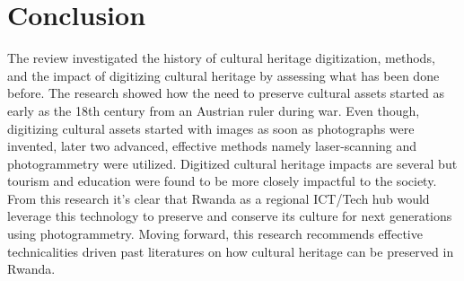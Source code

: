 \documentclass[conference]{IEEEtran}
\begin{document}
\section{\textbf{Conclusion}}
The review investigated the history of cultural heritage digitization, methods, and the impact of digitizing cultural heritage by assessing what has been done before.
The research showed how the need to preserve cultural assets started as early as the 18th century from an Austrian ruler during war. Even though, digitizing cultural assets started with images as soon as photographs were invented, later two
advanced, effective methods namely laser-scanning and photogrammetry were utilized. Digitized cultural heritage impacts are several but tourism and education were found to be more closely impactful to the society. From this research it's clear
that Rwanda as a regional ICT/Tech hub \cite{rwtechub} would leverage this technology to preserve and conserve its culture for next generations using photogrammetry. Moving forward, this research recommends effective technicalities driven past literatures on how
cultural heritage can be preserved in Rwanda.




\printbibliography
\end{document}
